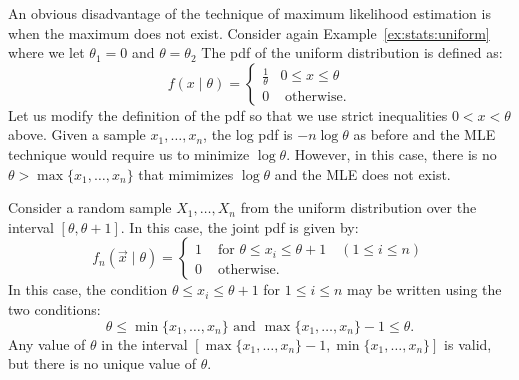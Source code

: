 \begin{example}
An obvious disadvantage of the technique of maximum likelihood estimation 
is when the maximum does not exist. Consider again Example~\ref{ex:stats:uniform}
where we let $\theta_1 = 0$ and $\theta = \theta_2$
The pdf of the uniform distribution is defined as:
\[
    f(x \mid \theta) 
        = \left \{ 
            \begin{array}{ll}
                \frac{1}{\theta} & 0 \leq x \leq \theta \\
                0  & \text{ otherwise}. 
            \end{array}
          \right . 
\]
Let us modify the definition of the pdf so that we use strict inequalities 
$0 < x < \theta$ above. Given a sample $x_1, \ldots, x_n$, the log pdf is 
$- n \log \theta$ as before and the MLE technique would require us to 
minimize $\log \theta$. However, in this case, there is no  
$\theta > \max \{x_1, \ldots, x_n\}$ that mimimizes $\log \theta$ and the 
MLE does not exist.    
\end{example}

\begin{example}
Consider a random sample $X_1, \ldots, X_n$ from the uniform distribution 
over the interval $[\theta, \theta + 1]$. In this case, the joint pdf 
is given by:
\[
    f_n(\vec{x} \mid \theta) 
        = \left \{ 
            \begin{array}{ll}
                1  & \text{ for } \theta \leq x_i \leq \theta + 1 \quad (1 \leq i \leq n)\\
                0  & \text{ otherwise}. 
            \end{array}
          \right . 
\]
In this case, the condition $\theta \leq x_i \leq \theta + 1$ for $1 \leq i \leq n$
may be written using the two conditions:
\[
    \theta \leq \min \{x_1, \ldots, x_n\} \text{ and } 
    \max \{x_1, \ldots, x_n \} - 1 \leq \theta.
\]
Any value of $\theta$ in the interval $[\max \{x_1, \ldots, x_n \} - 1, 
\min \{x_1, \ldots, x_n\}]$ is valid, but there is no unique value of $\theta$.
\end{example}

